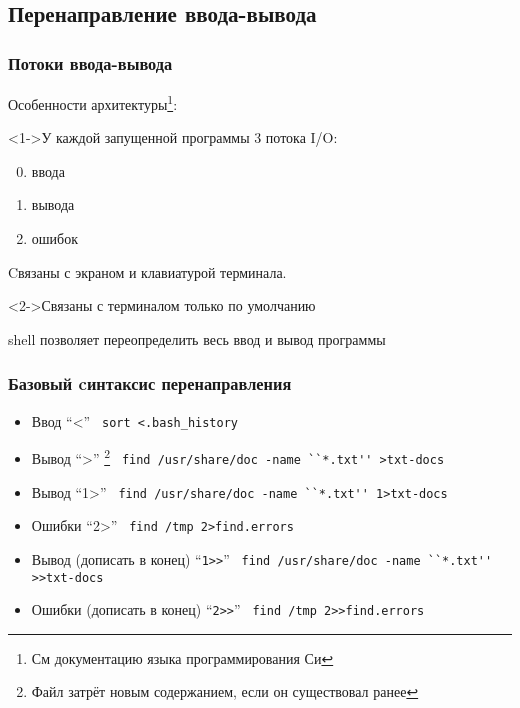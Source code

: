 \subsection{Перенаправление ввода-вывода}
\begin{frame}
  \frametitle{Потоки ввода-вывода}
  
  Особенности архитектуры\footnote{См документацию языка программирования Си}:
  \begin{block}<1->{У каждой запущенной программы 3 потока I/O:}
    \begin{enumerate}
      \setcounter{enumi}{-1}
      \item ввода
      \item вывода
      \item ошибок
    \end{enumerate}

    Cвязаны с экраном и клавиатурой терминала. \pause \newline
  \end{block}

  \begin{block}<2->{Связаны с терминалом только по умолчанию}

    \alert{shell позволяет переопределить весь ввод и вывод программы}
  \end{block}

\end{frame}

\begin{frame}[fragile]
  \frametitle{Базовый cинтаксис перенаправления}
  \begin{itemize}    
    \item \alert{Ввод} ``<'' \newline
      \verb+ sort <.bash_history+ \pause
    \item \alert{Вывод} ``>'' \footnote{Файл затрёт новым содержанием, если он существовал ранее} \newline
      \verb+ find /usr/share/doc -name ``*.txt'' >txt-docs+    
    \item \alert{Вывод} ``1>'' \newline
      \verb+ find /usr/share/doc -name ``*.txt'' 1>txt-docs+ \pause
    \item \alert{Ошибки} ``2>''\newline
      \verb+ find /tmp 2>find.errors+ \pause
    \item \alert{Вывод (дописать в конец)} ``\verb+1>>+'' \newline
      \verb+ find /usr/share/doc -name ``*.txt'' >>txt-docs+
    \item \alert{Ошибки (дописать в конец)} ``\verb+2>>+'' \newline 
      \verb+ find /tmp 2>>find.errors+ \pause
  \end{itemize}
\end{frame}

